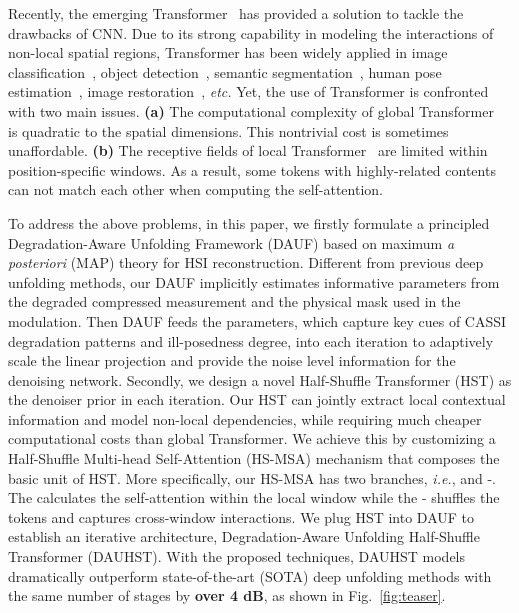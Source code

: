 \documentclass{article}
\begin{document}
Recently, the emerging Transformer~\cite{vaswani2017attention} has provided a solution to tackle the drawbacks of CNN. Due to its strong capability in modeling the interactions of non-local spatial regions, Transformer has been widely applied in image classification~\cite{liu2021swin,arnab2021vivit,global_msa,tc_2,tc_3,xcit,crossvit}, object detection~\cite{de_detr,to_1,liu2021swin,DETR,dy_detr,to_2,to_5}, semantic segmentation~\cite{liu2021swin,tc_3,ts_1,cao2021swin,ts_2,ts_3,ts_4}, human pose estimation~\cite{tokenpose,transpose,rsn,prtr,th_1,th_2,th_3}, image restoration~\cite{ipt,swinir,uformer,vsrt,fgst,mst,mst_pp,cst,pngan,rformer}, \emph{etc.} Yet, the use of Transformer is confronted with two main issues. \textbf{(a)} The computational complexity of global Transformer~\cite{global_msa} is quadratic to the spatial dimensions. This nontrivial cost is sometimes unaffordable. \textbf{(b)} The receptive fields of local Transformer~\cite{liu2021swin} are limited within position-specific windows. As a result, some tokens with highly-related contents can not match each other when computing the self-attention.  

To address the above problems, in this paper, we firstly formulate a principled Degradation-Aware Unfolding Framework (DAUF) based on maximum \emph{a posteriori} (MAP) theory for HSI reconstruction. Different from previous deep unfolding methods, our DAUF implicitly estimates informative parameters from the degraded compressed measurement and the physical mask used in the modulation. Then DAUF feeds the parameters, which capture key cues of CASSI degradation patterns and ill-posedness  degree, into each iteration to adaptively scale the linear projection and provide the noise level information for the denoising network. Secondly, we design a novel Half-Shuffle Transformer (HST) as the denoiser prior in each iteration. Our HST can jointly extract local contextual information and model non-local dependencies, while requiring much cheaper computational costs than global Transformer. We achieve this by customizing a Half-Shuffle Multi-head Self-Attention (HS-MSA) mechanism that composes the basic unit of HST. More specifically, our HS-MSA has two branches, \emph{i.e.},  and -. The  calculates the self-attention within the local window while the - shuffles the tokens and captures cross-window interactions. We plug HST into DAUF to establish an  iterative architecture, Degradation-Aware Unfolding Half-Shuffle Transformer (DAUHST). With the proposed  techniques, DAUHST models dramatically outperform state-of-the-art (SOTA) deep unfolding methods  with the same number of stages by \textbf{over 4 dB}, as shown in Fig.~\ref{fig:teaser}.
\end{document}
